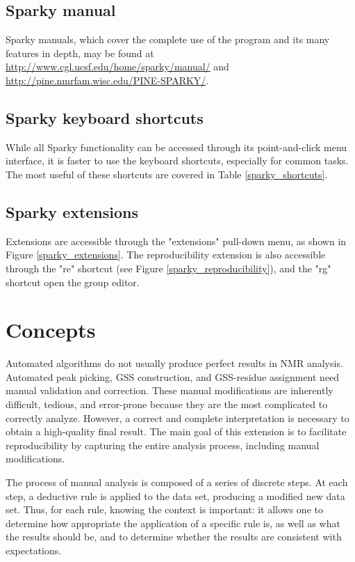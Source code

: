 \subsection*{Sparky manual}
Sparky manuals, which cover the complete use of the program and its many
features in depth, may be found at 
\url{http://www.cgl.ucsf.edu/home/sparky/manual/} and 
\url{http://pine.nmrfam.wisc.edu/PINE-SPARKY/}.

\subsection*{Sparky keyboard shortcuts}
While all Sparky functionality can be accessed through its point-and-click
menu interface, it is faster to use the keyboard shortcuts, especially
for common tasks.  The most useful of these shortcuts are covered in Table
\ref{sparky_shortcuts}.

\subsection*{Sparky extensions}
Extensions are accessible through the "extensions" pull-down menu, as shown 
in Figure \ref{sparky_extensions}. The reproducibility extension is also 
accessible through the "re" shortcut (see Figure \ref{sparky_reproducibility}),
and the "rg" shortcut open the group editor.



\section{Concepts}
Automated algorithms do not usually produce perfect results in NMR analysis.
Automated peak picking,
GSS construction, and GSS-residue assignment need manual validation and
correction.  These manual modifications are inherently difficult, tedious,
and error-prone because they are the most complicated to correctly analyze.
However, a correct and complete interpretation is necessary to obtain a 
high-quality final result.
The main goal of this extension is to facilitate reproducibility
by capturing the entire analysis process, including manual modifications.

The process of manual analysis is composed of a series of discrete steps.
At each step, a deductive rule is applied to the data set, producing a
modified new data set.  Thus, for each rule, knowing the context is important:
it allows one to determine how appropriate the application of a specific rule
is, as well as what the results should be, and to determine whether the 
results are consistent with expectations.

